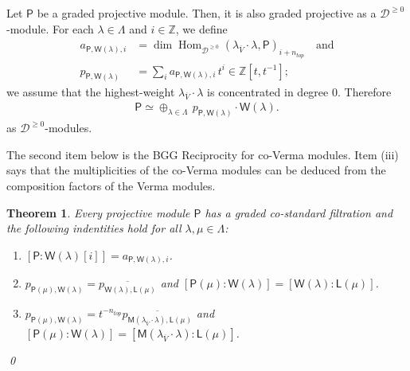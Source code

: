 \documentclass[reqno]{amsart}
\newcommand{\oV}{\overline{V}}
\renewcommand{\_}[1]{_{\left( #1 \right)}}
\renewcommand{\^}[1]{^{\left( #1 \right)}}
\newcommand\fL{\mathsf{L}}
\newcommand\fM{\mathsf{M}}
\newcommand\fP{\mathsf{P}}
\newcommand\fW{\mathsf{W}}
\newcommand{\Z}{{\mathbb Z}}
\newcommand{\D}{\mathcal{D}}
\newcommand\Hom{\operatorname{Hom}}
\theoremstyle{plain}
\newtheorem{theorem}[lema]{Theorem}
\theoremstyle{definition}
\theoremstyle{remark}
\begin{document}


Let $\fP$ be a graded projective module. Then, it is also graded projective as a $\D^{\geq0}$-module. For each $\lambda\in\Lambda$ and $i\in\Z$, we define
\begin{align}\label{eq:definition of a fP fWlambda i}
a_{\fP,\fW(\lambda),i}&=\dim\Hom_{\D^{\geq0}}(\lambda_{\oV}\cdot\lambda,\fP)_{i+n_{top}}\quad\mbox{and}\\
\label{eq:def of p fP fWlambda i}
p_{\fP,\fW(\lambda)}&=\sum_{i}a_{\fP,\fW(\lambda),i}\,t^i\in\Z[t,t^{-1}];
\end{align}
we assume that the highest-weight $\lambda_{\oV}\cdot\lambda$ is concentrated in degree $0$. Therefore
\begin{align}\label{eq:P pol verma as Dgeq}
\fP\simeq\oplus_{\lambda\in\Lambda}\,p_{\fP,\fW(\lambda)}\cdot\fW(\lambda).
\end{align}
as $\D^{\geq0}$-modules.

The second item below is the BGG Reciprocity for co-Verma modules. Item (iii) says that the multiplicities of the co-Verma modules can be deduced from the composition factors of the Verma modules.

\begin{theorem}\label{teo:costandard filtration BGG}
Every projective module $\fP$ has a graded co-standard filtration and the following indentities hold for all $\lambda,\mu\in\Lambda$:
\begin{enumerate}[label=(\roman*)]
\item $\left[\fP:\fW(\lambda)[i]\right]=a_{\fP,\fW(\lambda),i}$.
\smallskip
\item $p_{\fP(\mu),\fW(\lambda)}=\overline{p_{\fW(\lambda),\fL(\mu)}}$ and $[\fP(\mu):\fW(\lambda)]=[\fW(\lambda):\fL(\mu)]$.
\smallskip
\item $p_{\fP(\mu),\fW(\lambda)}=t^{-n_{top}}\overline{p_{\fM(\lambda_{\oV}\cdot\lambda),\fL(\mu)}}$ and $[\fP(\mu):\fW(\lambda)]=[\fM(\lambda_{\oV}\cdot\lambda):\fL(\mu)]$.
\end{enumerate}
\qed
\end{theorem}
\end{document}
